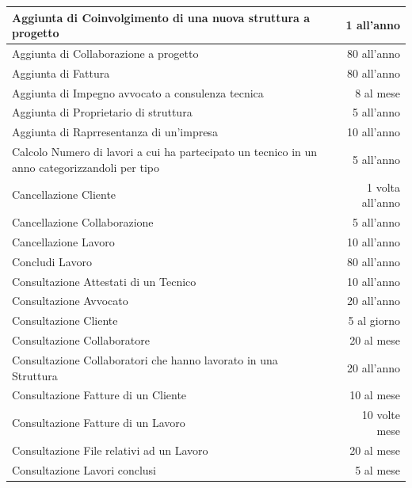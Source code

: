 \documentclass{elegantbook}
\begin{document}
\begin{longtable}{|p{13cm}|r|}
            \hline
            Aggiunta di Coinvolgimento di una nuova struttura a progetto  &  1 all'anno \\
            \hline
            Aggiunta di Collaborazione a progetto  & 80 all'anno \\
            \hline
            Aggiunta di Fattura  & 80 all'anno \\
            \hline
            Aggiunta di Impegno avvocato a consulenza tecnica  &  8 al mese \\
            \hline 
            Aggiunta di Proprietario di struttura  & 5 all'anno \\
            \hline
            Aggiunta di Raprresentanza di un'impresa  & 10 all'anno \\
            \hline
            Calcolo Numero di lavori a cui ha partecipato un tecnico in un anno categorizzandoli per tipo  & 5 all'anno \\
            \hline
            Cancellazione Cliente &  1 volta all'anno \\ %
            \hline
            Cancellazione Collaborazione  &  5 all'anno \\
            \hline 
            Cancellazione Lavoro  &  10 all'anno \\ %
            \hline
            Concludi Lavoro  & 80 all'anno \\
            \hline
            Consultazione Attestati di un Tecnico  &  10 all'anno \\
            \hline
            Consultazione Avvocato  & 20 all'anno \\
            \hline
            Consultazione Cliente  & 5 al giorno \\
            \hline
            Consultazione Collaboratore  & 20 al mese \\
            \hline
            Consultazione Collaboratori che hanno lavorato in una Struttura  & 20 all'anno \\
            \hline
            Consultazione Fatture di un Cliente  &  10 al mese \\
            \hline
            Consultazione Fatture di un Lavoro  & 10 volte mese \\
            \hline
            Consultazione File relativi ad un Lavoro  & 20 al mese \\
            \hline
            Consultazione Lavori conclusi  & 5 al mese \\

\end{longtable}
\end{document}
